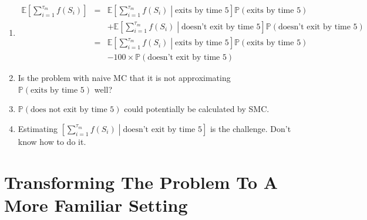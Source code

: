 \documentclass{article}
\begin{document}
\begin{enumerate}

\item \begin{eqnarray}
\mathbb{E} \left [ \sum_{i=1}^{\tau_{m}} f(S_{i}) \right ] & = & \mathbb{E} \left [ \sum_{i=1}^{\tau_{m}} f(S_{i}) \middle | \text{exits by time 5} \right ] \mathbb{P} (\text{exits by time 5})  \nonumber \\
& & + \mathbb{E} \left [ \sum_{i=1}^{\tau_{m}} f(S_{i}) \middle | \text{doesn't exit by time 5} \right ] \mathbb{P} (\text{doesn't exit by time 5}) \nonumber \\
& = & \mathbb{E} \left [ \sum_{i=1}^{\tau_{m}} f(S_{i}) \middle | \text{exits by time 5} \right ] \mathbb{P} (\text{exits by time 5}) \nonumber \\
& & -100 \times \mathbb{P} (\text{doesn't exit by time 5}) \nonumber
\end{eqnarray}

\item Is the problem with naive MC that it is not approximating $\mathbb{P} (\text{exits by time 5})$ well? 

\item $\mathbb{P} ( \text{does not exit by time 5}) $ could potentially be calculated by SMC.

\item Estimating $\left [ \sum_{i=1}^{\tau_{m}} f(S_{i}) \middle | \text{doesn't exit by time 5} \right ]$ is the challenge. Don't know how to do it.

\end{enumerate}

\section{Transforming The Problem To A More Familiar Setting}
\end{document}
